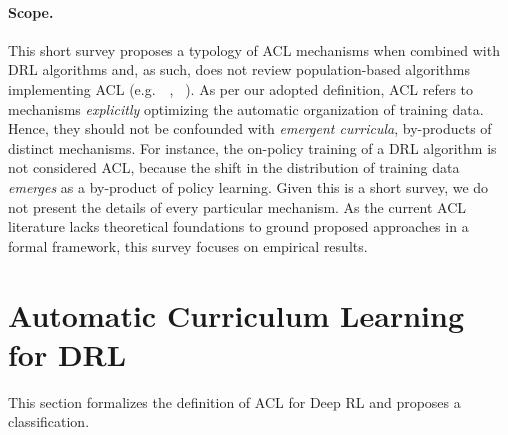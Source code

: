 \documentclass{article}
\newcommand{\mycite}[1]{\citeauthor{#1}~\shortcite{#1}}
\begin{document}
\paragraph{Scope.}This short survey proposes a typology of ACL mechanisms when combined with DRL algorithms and, as such, does not review population-based algorithms implementing ACL (e.g.~\mycite{imgep}, \mycite{poet}). 
%
As per our adopted definition, ACL refers to mechanisms \textit{explicitly} optimizing the automatic organization of training data. Hence, they should not be confounded with \textit{emergent curricula}, by-products of distinct mechanisms. For instance, the on-policy training of a DRL algorithm is not considered ACL, because the shift in the distribution of training data \textit{emerges} as a by-product of policy learning.
%
Given this is a short survey, we do not present the details of every particular mechanism. As the current ACL literature lacks theoretical foundations to ground proposed approaches in a formal framework, this survey focuses on empirical results.



\section{Automatic Curriculum Learning for DRL}
\label{sec:2}

This section formalizes the definition of ACL for Deep RL and proposes a classification. 
\end{document}
